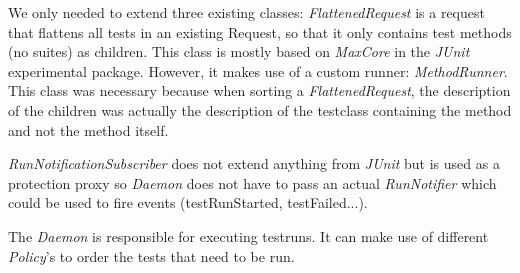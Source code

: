 \documentclass[i2]{oss}
\newcommand{\class}[1]{\emph{#1}}
\newcommand{\junit}{\emph{JUnit }}
\begin{document}
We only needed to extend three existing classes: \class{FlattenedRequest}
is a request that flattens all tests in an existing Request, so that it only contains test methods (no suites) as children. 
This class is mostly based on \class{MaxCore} in the \junit experimental package. 
However, it makes use of a custom runner: \class{MethodRunner}. 
This class was necessary because when sorting a \class{FlattenedRequest}, the description of the children was actually the
description of the testclass containing the method and not the method 
itself.

\class{RunNotificationSubscriber} does not extend anything from 
\junit but is used as a protection proxy so \class{Daemon} does not have 
to pass an actual \class{RunNotifier} which could be used to fire events 
(testRunStarted, testFailed...). 

The \class{Daemon} is responsible for executing testruns.
It can make use of different \class{Policy}'s to order the tests that 
need to be run. 
\end{document}
